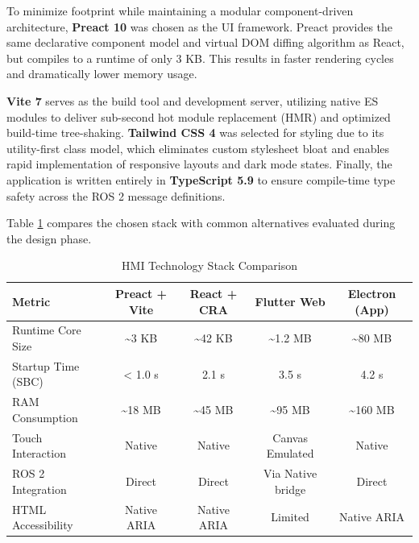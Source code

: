 To minimize footprint while maintaining a modular component-driven architecture, \textbf{Preact 10} was chosen as the UI framework. Preact provides the same declarative component model and virtual DOM diffing algorithm as React, but compiles to a runtime of only 3 KB. This results in faster rendering cycles and dramatically lower memory usage. 

\textbf{Vite 7} serves as the build tool and development server, utilizing native ES modules to deliver sub-second hot module replacement (HMR) and optimized build-time tree-shaking. \textbf{Tailwind CSS 4} was selected for styling due to its utility-first class model, which eliminates custom stylesheet bloat and enables rapid implementation of responsive layouts and dark mode states. Finally, the application is written entirely in \textbf{TypeScript 5.9} to ensure compile-time type safety across the ROS 2 message definitions.

Table \ref{tab:framework-comparison} compares the chosen stack with common alternatives evaluated during the design phase.

\begin{table}[H]
\centering
\caption{HMI Technology Stack Comparison}
\label{tab:framework-comparison}
\begin{tabularx}{\textwidth}{|>{\raggedright\arraybackslash}X|c|c|c|c|}
\hline
\textbf{Metric} & \textbf{Preact + Vite} & \textbf{React + CRA} & \textbf{Flutter Web} & \textbf{Electron (App)} \\ \hline
Runtime Core Size & \textasciitilde 3 KB & \textasciitilde 42 KB & \textasciitilde 1.2 MB & \textasciitilde 80 MB \\ \hline
Startup Time (SBC) & < 1.0 s & 2.1 s & 3.5 s & 4.2 s \\ \hline
RAM Consumption & \textasciitilde 18 MB & \textasciitilde 45 MB & \textasciitilde 95 MB & \textasciitilde 160 MB \\ \hline
Touch Interaction & Native & Native & Canvas Emulated & Native \\ \hline
ROS 2 Integration & Direct & Direct & Via Native bridge & Direct \\ \hline
HTML Accessibility & Native ARIA & Native ARIA & Limited & Native ARIA \\ \hline
\end{tabularx}
\end{table}

